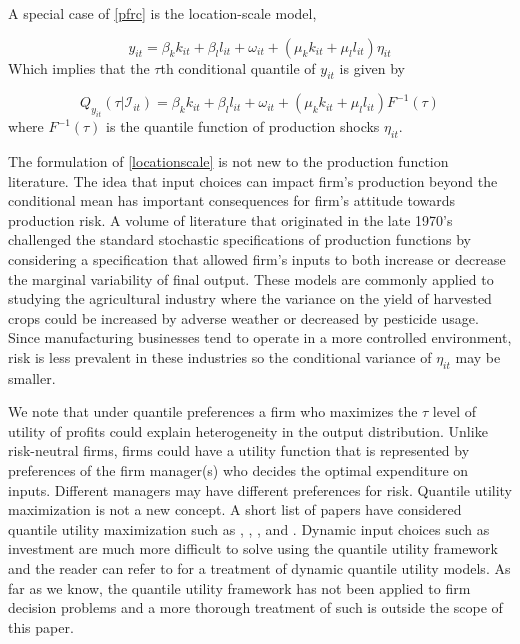\documentclass[11pt]{article}
\begin{document}
A special case of \eqref{pfrc} is the location-scale model,

\begin{equation} \label{locationscale}
    y_{it}=\beta_{k}k_{it}+\beta_{l}l_{it}+\omega_{it}+(\mu_{k}k_{it}+\mu_{l}l_{it})\eta_{it}
\end{equation}
Which implies that the $\tau$th conditional quantile of $y_{it}$ is given by

\begin{equation}
Q_{y_{it}}(\tau|\mathcal{I}_{it})=\beta_{k}k_{it}+\beta_{l}l_{it}+\omega_{it}+(\mu_{k}k_{it}+\mu_{l}l_{it})F^{-1}(\tau)
\end{equation}
where $F^{-1}(\tau)$ is the quantile function of production shocks $\eta_{it}$.

The formulation of \eqref{locationscale} is not new to the production function literature. The idea that input choices can impact firm's production beyond the conditional mean has important consequences for firm's attitude towards production risk. A volume of literature that originated in the late 1970's challenged the standard stochastic specifications of production functions \citep{Just1978,Just1979} by considering a specification that allowed firm's inputs to both increase or decrease the marginal variability of final output. These models are commonly applied to studying the agricultural industry where the variance on the yield of harvested crops could be increased by adverse weather or decreased by pesticide usage. Since manufacturing businesses tend to operate in a more controlled environment, risk is less prevalent in these industries so the conditional variance of $\eta_{it}$ may be smaller.

We note that under quantile preferences a firm who maximizes the $\tau$ level of utility of profits could explain heterogeneity in the output distribution. Unlike risk-neutral firms, firms could have a utility function that is represented by preferences of the firm manager(s) who decides the optimal expenditure on inputs. Different managers may have different preferences for risk. Quantile utility maximization is not a new concept. A short list of papers have considered quantile utility maximization such as \cite{Manski1988}, \cite{ROSTEK2009}, \cite{Chambers2007}, and \cite{Bhattacharya2009}. Dynamic input choices such as investment are much more difficult to solve using the quantile utility framework and the reader can refer to \cite{Castro2017} for a treatment of dynamic quantile utility models. As far as we know, the quantile utility framework has not been applied to firm decision problems and a more thorough treatment of such is outside the scope of this paper.
\end{document}
